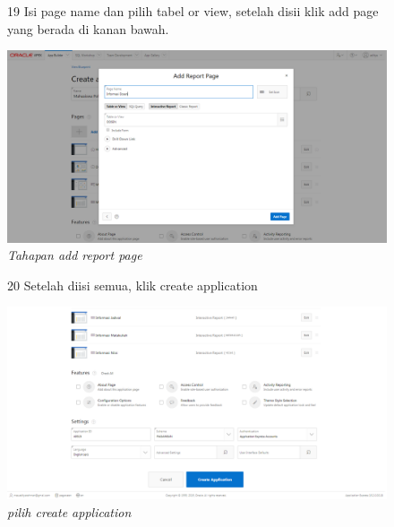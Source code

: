 \begin{enumerate}
\begin{figure}[!htbp]
\item[19] Isi page name dan pilih tabel or view, setelah disii klik add page yang berada di kanan bawah. 
	\begin{center}
	\includegraphics[scale=0.2]{figures/tahap21.png}
	\caption{\textit{Tahapan add report page}}
	\end{center}	 
\end{figure}

\begin{figure}[!htbp]
\item[20] Setelah diisi semua, klik create application
	\begin{center}
	\includegraphics[scale=0.2]{figures/tahap22.png}
	\caption{\textit{pilih create application}}
	\end{center}	 
\end{figure}


\end{enumerate}
